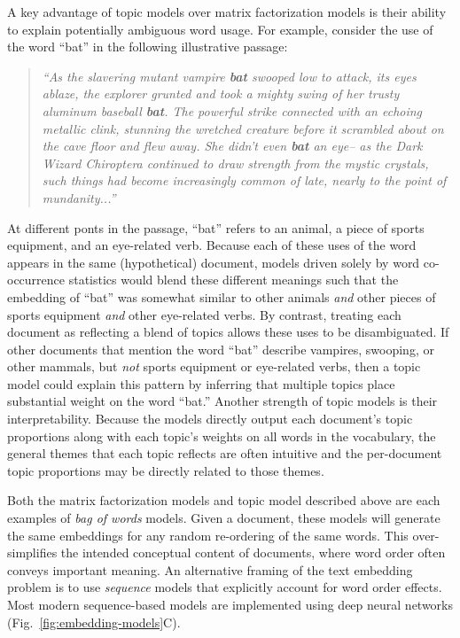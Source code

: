 \documentclass{article}
\begin{document}
A key advantage of topic models over matrix factorization models is their ability to explain potentially ambiguous word usage.  For example, consider the use of the word ``bat'' in the following illustrative passage:
\begin{quote}
  \textit{``As the slavering mutant vampire \textbf{bat} swooped low to attack, its eyes ablaze, the explorer grunted and took a mighty swing of her trusty aluminum baseball \textbf{bat}.  The powerful strike connected with an echoing metallic \textit{clink}, stunning the wretched creature before it scrambled about on the cave floor and flew away.  She didn't even \textbf{bat} an eye-- as the Dark Wizard Chiroptera continued to draw strength from the mystic crystals, such things had become increasingly common of late, nearly to the point of mundanity...''}
  \end{quote}
At different ponts in the passage, ``bat'' refers to an animal, a piece of sports equipment, and an eye-related verb.  Because each of these uses of the word appears in the same (hypothetical) document, models driven solely by word co-occurrence statistics would blend these different meanings such that the embedding of ``bat'' was somewhat similar to other animals \textit{and} other pieces of sports equipment \textit{and} other eye-related verbs.  By contrast, treating each document as reflecting a blend of topics allows these uses to be disambiguated.  If other documents that mention the word ``bat'' describe vampires, swooping, or other mammals, but \textit{not} sports equipment or eye-related verbs, then a topic model could explain this pattern by inferring that multiple topics place substantial weight on the word ``bat.''  Another strength of topic models is their interpretability.  Because the models directly output each document's topic proportions along with each topic's weights on all words in the vocabulary, the general themes that each topic reflects are often intuitive and the per-document topic proportions may be directly related to those themes.

Both the matrix factorization models and topic model described above are each examples of \textit{bag of words} models.  Given a document, these models will generate the same embeddings for any random re-ordering of the same words.  This over-simplifies the intended conceptual content of documents, where word order often conveys important meaning.  An alternative framing of the text embedding problem is to use \textit{sequence} models that explicitly account for word order effects.  Most modern sequence-based models are implemented using deep neural networks (Fig.~\ref{fig:embedding-models}C).
\end{document}
